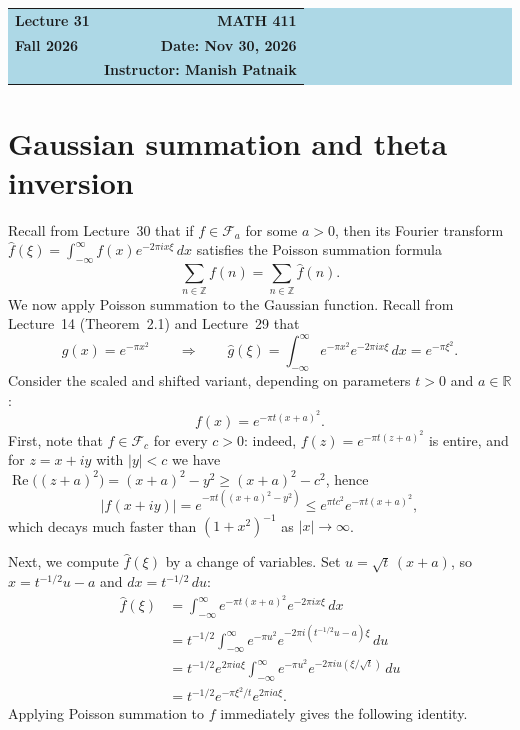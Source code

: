 \documentclass[11pt]{article}
\theoremstyle{plain}
\theoremstyle{definition}
\theoremstyle{boldremark}
\theoremstyle{remark}
\numberwithin{equation}{section}
\newcommand{\R}{\mathbb{R}}
\newcommand{\Z}{\mathbb{Z}}
\DeclareMathOperator{\Real}{Re}
\begin{document}
\begin{center}
  \colorbox{lightblue}{%
    \begin{minipage}{0.94\textwidth}
      \vspace{0.55em}
      \begin{tabular*}{\textwidth}{@{\extracolsep{\fill}}lr}
        {\color{courseblue}\bfseries\LARGE Lecture 31} &
        {\color{courseblue}\bfseries\LARGE MATH 411}\\[0.35em]
        \textbf{Fall 2026} & \textbf{Date: Nov 30, 2026}\\
        & \textbf{Instructor: Manish Patnaik}
      \end{tabular*}
      \vspace{0.45em}
    \end{minipage}}
\end{center}

\setcounter{tocdepth}{1}
\tableofcontents
\vspace{0.45em}

\section{Gaussian summation and theta inversion}

Recall from Lecture~30 that if $f\in\mathcal F_a$ for some $a>0$, then its
Fourier transform $\widehat f(\xi)=\int_{-\infty}^{\infty}f(x)e^{-2\pi ix\xi}\,dx$
satisfies the Poisson summation formula
\[
 \sum_{n\in\Z} f(n) = \sum_{n\in\Z}\widehat f(n).
\]
We now apply Poisson summation to the Gaussian function. Recall from
Lecture~14 (Theorem~2.1) and Lecture~29 that
\[
 g(x) = e^{-\pi x^2}
 \qquad\Longrightarrow\qquad
 \widehat g(\xi) = \int_{-\infty}^{\infty} e^{-\pi x^2}e^{-2\pi i x\xi}\,dx
 = e^{-\pi\xi^2}.
\]
Consider the scaled and shifted variant, depending on parameters $t>0$ and
$a\in\R$:
\[
 f(x) = e^{-\pi t(x+a)^2}.
\]
First, note that $f\in\mathcal F_c$ for every $c>0$: indeed,
$f(z)=e^{-\pi t(z+a)^2}$ is entire, and for $z=x+iy$ with $|y|<c$ we have
$\Real\bigl((z+a)^2\bigr)=(x+a)^2-y^2\geq (x+a)^2-c^2$, hence
\[
 |f(x+iy)| = e^{-\pi t((x+a)^2-y^2)} \leq e^{\pi t c^2} e^{-\pi t(x+a)^2},
\]
which decays much faster than $(1+x^2)^{-1}$ as $|x|\to\infty$.

Next, we compute $\widehat f(\xi)$ by a change of variables. Set
$u=\sqrt{t}\,(x+a)$, so $x=t^{-1/2}u-a$ and $dx=t^{-1/2}\,du$:
\begin{align*}
 \widehat f(\xi)
 &= \int_{-\infty}^{\infty} e^{-\pi t(x+a)^2}e^{-2\pi i x\xi}\,dx \\
 &= t^{-1/2}\int_{-\infty}^{\infty}
    e^{-\pi u^2}e^{-2\pi i(t^{-1/2}u-a)\xi}\,du \\
 &= t^{-1/2} e^{2\pi i a\xi}
    \int_{-\infty}^{\infty} e^{-\pi u^2}e^{-2\pi i u(\xi/\sqrt t)}\,du \\
 &= t^{-1/2} e^{-\pi\xi^2/t} e^{2\pi i a\xi}.
\end{align*}
Applying Poisson summation to $f$ immediately gives the following identity.
\end{document}
